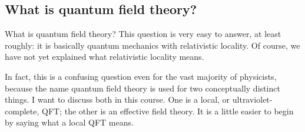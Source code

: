 
\label{ch:253a-basic-generalities}

\subsection{What is quantum field theory?}
\label{sec:253a-what-is-qft}

What is quantum field theory? This question is very easy to answer, at least
roughly: it is basically quantum mechanics with relativistic locality.
Of course, we have not yet explained what relativistic locality means.

In fact, this is a confusing question even for the vast majority of physicists,
because the name quantum field theory is used for two conceptually distinct
things.
I want to discuss both in this course. One is a local, or ultraviolet-complete,
QFT; the other is an effective field theory.
It is a little easier to begin by saying what a local QFT means.


